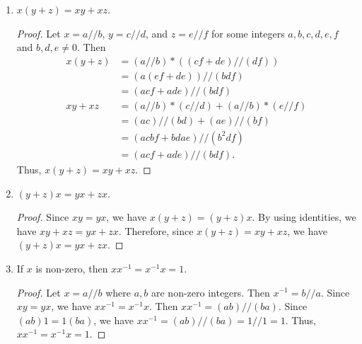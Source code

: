 \documentclass[12pt, letter]{article}
\begin{document}
\begin{enumerate}
\begin{proof}
\begin{equation*}
            \begin{aligned}
                x1&=(a//b)*(1//1)\\
                &=(a1)//(b1)\\
                &=a//b\\
                &=x.
            \end{aligned}
        \end{equation*}
        Thus, $x1=1x=x$.
    \end{proof}
    \item $x(y+z)=xy+xz$.
    \begin{proof}
        Let $x=a//b$, $y=c//d$, and $z=e//f$ for some integers $a,b,c,d,e,f$ and $b,d,e\ne 0$. Then 
        \begin{equation*}
            \begin{aligned}
                x(y+z)&=(a//b)*((cf+de)//(df))\\
                &=(a(ef+de))//(bdf)\\
                &=(acf+ade)//(bdf)\\
                xy+xz&=(a//b)*(c//d)+(a//b)*(e//f)\\
                &=(ac)//(bd)+(ae)//(bf)\\
                &=(acbf+bdae)//(b^2df)\\
                &=(acf+ade)//(bdf).
            \end{aligned}
        \end{equation*}
        Thus, $x(y+z)=xy+xz$.
    \end{proof}
    \item $(y+z)x=yx+zx$.
    \begin{proof}
        Since $xy=yx$, we have $x(y+z)=(y+z)x$. By using identities, we have $xy+xz=yx+zx$. Therefore, since $x(y+z)=xy+xz$, we have $(y+z)x=yx+zx$.
    \end{proof}
    \item If $x$ is non-zero, then $xx^{-1}=x^{-1}x=1$.
    \begin{proof}
        Let $x=a//b$ where $a,b$ are non-zero integers. Then $x^{-1}=b//a$. Since $xy=yx$, we have $xx^{-1}=x^{-1}x$. Then 
        $xx^{-1}=(ab)//(ba)$. Since $(ab)1=1(ba)$, we have $xx^{-1}=(ab)//(ba)=1//1=1$. Thus, $xx^{-1}=x^{-1}x=1$.
    \end{proof}
\end{enumerate}
\end{document}
